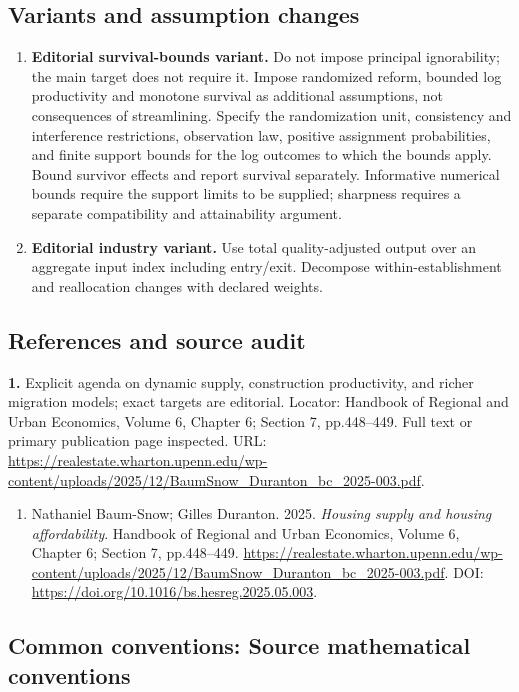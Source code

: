 \documentclass[11pt,a4paper]{article}
\begin{document}
\subsection*{Variants and assumption changes}
\begin{enumerate}
\item \textbf{Editorial survival-bounds variant.} Do not impose principal ignorability; the main target does not require it. Impose randomized reform, bounded log productivity and monotone survival as additional assumptions, not consequences of streamlining. Specify the randomization unit, consistency and interference restrictions, observation law, positive assignment probabilities, and finite support bounds for the log outcomes to which the bounds apply. Bound survivor effects and report survival separately. Informative numerical bounds require the support limits to be supplied; sharpness requires a separate compatibility and attainability argument.
\item \textbf{Editorial industry variant.} Use total quality-adjusted output over an aggregate input index including entry/exit. Decompose within-establishment and reallocation changes with declared weights.
\end{enumerate}
\subsection*{References and source audit}
\textbf{1.} Explicit agenda on dynamic supply, construction productivity, and richer migration models; exact targets are editorial. Locator: Handbook of Regional and Urban Economics, Volume 6, Chapter 6; Section 7, pp.448–449. Full text or primary publication page inspected. URL: \url{https://realestate.wharton.upenn.edu/wp-content/uploads/2025/12/BaumSnow_Duranton_bc_2025-003.pdf}.
\begin{enumerate}\raggedright
\item\hypertarget{definitions:source:30007744:1}{} Nathaniel Baum-Snow; Gilles Duranton. 2025. \emph{Housing supply and housing affordability}. Handbook of Regional and Urban Economics, Volume 6, Chapter 6; Section 7, pp.448–449.
\url{https://realestate.wharton.upenn.edu/wp-content/uploads/2025/12/BaumSnow_Duranton_bc_2025-003.pdf}.
DOI: \url{https://doi.org/10.1016/bs.hesreg.2025.05.003}.
\end{enumerate}

\subsection*{Common conventions: Source mathematical conventions}
\end{document}
